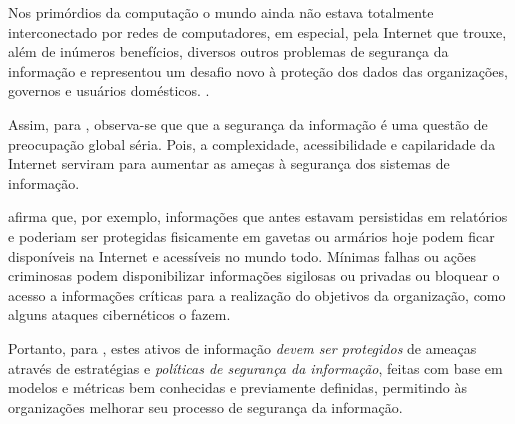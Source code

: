 Nos primórdios da computação o mundo ainda não estava totalmente interconectado por redes de computadores, em especial, pela Internet que trouxe, além de inúmeros benefícios, diversos outros problemas de segurança da informação e representou um desafio novo à proteção dos dados das organizações, governos e usuários domésticos. \cite{fontes_politicas}. 

Assim, para , observa-se que que a segurança da informação é uma questão de preocupação global séria. Pois, a complexidade, acessibilidade e capilaridade da Internet serviram para aumentar as ameças à segurança dos sistemas de informação.

 afirma que, por exemplo, informações que antes estavam persistidas em relatórios e poderiam ser protegidas fisicamente em gavetas ou armários hoje podem ficar disponíveis na Internet e acessíveis no mundo todo. Mínimas falhas ou ações criminosas podem disponibilizar informações sigilosas ou privadas ou bloquear o acesso a informações críticas para a realização do objetivos da organização, como alguns ataques cibernéticos o fazem.

Portanto, para , estes ativos de informação \textit{devem ser protegidos} de ameaças através de estratégias e \textit{políticas de segurança  da  informação},  feitas com  base  em  modelos  e  métricas bem  conhecidas e previamente definidas, permitindo  às  organizações  melhorar  seu processo de segurança da informação.

%
%
%
%

